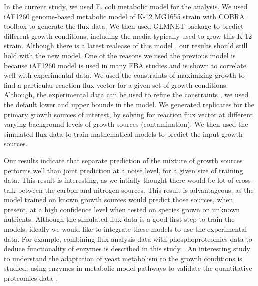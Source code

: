 \documentclass[12pt]{article}
\begin{document}
\bigskip
\noindent
In the current study, we used E. coli metabolic model for the analysis. We used iAF1260 genome-based metabolic model of K-12 MG1655 strain with COBRA toolbox to generate the flux data. We then used GLMNET package to predict different growth conditions, including the media typically used to grow this K-12 strain. Although there is a latest realease of this model \cite{Orthetal2012}, our results should still hold with the new model. One of the reasons we used the previous model is because iAF1260 model is used in many FBA studies and is shown to correlate well with experimental data. We used the constraints of maximizing growth to find a particular reaction flux vector for a given set of growth conditions. Although, the experimental data can be used to refine the constraints \cite{Brandesetal2012}, we used the default lower and upper bounds in the model. We generated replicates for the primary growth sources of interest, by solving for reaction flux vector at different varying background levels of growth sources (contamination). We then used the simulated flux data to train mathematical models to predict the input growth sources. 

\bigskip
\noindent
Our results indicate that separate prediction of the mixture of growth sources performs well than joint prediction at a noise level, for a given size of training data. This result is interesting, as we intially thought there would be lot of cross-talk between the carbon and nitrogen sources. This result is advantageous, as the model trained on known growth sources would predict those sources, when present, at a high confidence level when tested on species grown on unknown nutrients. Although the simulated flux data is a good first step to train the models, ideally we would like to integrate these models to use the experimental data. For example, combining flux analysis data with phosphoproteomics data to deduce functionality of enzymes is described in this study \cite{Oliveiraetal2012}. An interesting study to understand the adaptation of yeast metabolism to the growth conditions is studied, using enzymes in metabolic model pathways to validate the quantitative proteomics data \cite{Costenobleetal2011}.
 
%
\end{document}
